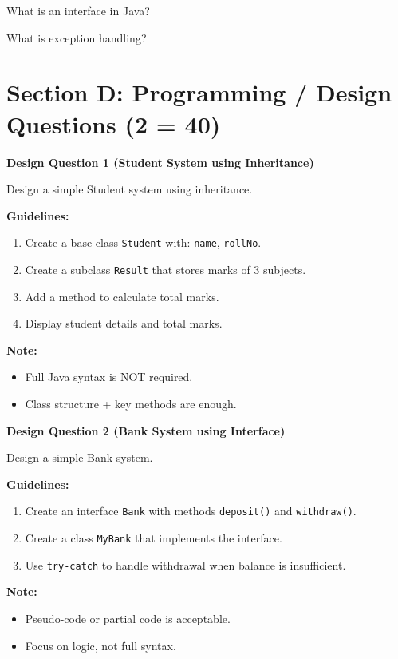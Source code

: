 \documentclass{USTBExam}
\begin{document}
\begin{problem}
What is an interface in Java?
\end{problem}

\begin{problem}
What is exception handling?
\end{problem}

\section{Section D: Programming / Design Questions (2  = 40)}

\begin{problem}
    \textbf{Design Question 1 (Student System using Inheritance)}
    
    Design a simple Student system using inheritance.
    
    \textbf{Guidelines:}
    \begin{enumerate}
      \item Create a base class \texttt{Student} with: \texttt{name}, \texttt{rollNo}.
      \item Create a subclass \texttt{Result} that stores marks of 3 subjects.
      \item Add a method to calculate total marks.
      \item Display student details and total marks.
    \end{enumerate}
    
    \textbf{Note:}
    \begin{itemize}
      \item Full Java syntax is NOT required.
      \item Class structure + key methods are enough.
    \end{itemize}
    \end{problem}
    

    \begin{problem}
        \textbf{Design Question 2 (Bank System using Interface)}
        
        Design a simple Bank system.
        
        \textbf{Guidelines:}
        \begin{enumerate}
          \item Create an interface \texttt{Bank} with methods \texttt{deposit()} and \texttt{withdraw()}.
          \item Create a class \texttt{MyBank} that implements the interface.
          \item Use \texttt{try-catch} to handle withdrawal when balance is insufficient.
        \end{enumerate}
        
        \textbf{Note:}
        \begin{itemize}
          \item Pseudo-code or partial code is acceptable.
          \item Focus on logic, not full syntax.
        \end{itemize}
        \end{problem}
        
\end{document}
